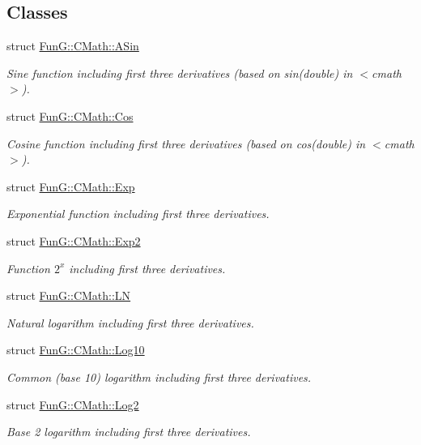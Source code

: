 \subsection*{Classes}
\begin{DoxyCompactItemize}
\item 
struct \hyperlink{structFunG_1_1CMath_1_1ASin}{Fun\-G\-::\-C\-Math\-::\-A\-Sin}
\begin{DoxyCompactList}\small\item\em Sine function including first three derivatives (based on sin(double) in $<$cmath$>$). \end{DoxyCompactList}\item 
struct \hyperlink{structFunG_1_1CMath_1_1Cos}{Fun\-G\-::\-C\-Math\-::\-Cos}
\begin{DoxyCompactList}\small\item\em Cosine function including first three derivatives (based on cos(double) in $<$cmath$>$). \end{DoxyCompactList}\item 
struct \hyperlink{structFunG_1_1CMath_1_1Exp}{Fun\-G\-::\-C\-Math\-::\-Exp}
\begin{DoxyCompactList}\small\item\em Exponential function including first three derivatives. \end{DoxyCompactList}\item 
struct \hyperlink{structFunG_1_1CMath_1_1Exp2}{Fun\-G\-::\-C\-Math\-::\-Exp2}
\begin{DoxyCompactList}\small\item\em Function $2^x$ including first three derivatives. \end{DoxyCompactList}\item 
struct \hyperlink{structFunG_1_1CMath_1_1LN}{Fun\-G\-::\-C\-Math\-::\-L\-N}
\begin{DoxyCompactList}\small\item\em Natural logarithm including first three derivatives. \end{DoxyCompactList}\item 
struct \hyperlink{structFunG_1_1CMath_1_1Log10}{Fun\-G\-::\-C\-Math\-::\-Log10}
\begin{DoxyCompactList}\small\item\em Common (base 10) logarithm including first three derivatives. \end{DoxyCompactList}\item 
struct \hyperlink{structFunG_1_1CMath_1_1Log2}{Fun\-G\-::\-C\-Math\-::\-Log2}
\begin{DoxyCompactList}\small\item\em Base 2 logarithm including first three derivatives. \end{DoxyCompactList}\item 

\end{DoxyCompactItemize}
